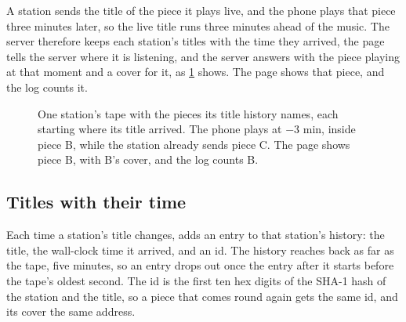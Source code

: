 \documentclass[11pt,a4paper]{article}
\begin{document}
A station sends the title of the piece it plays live, and the phone plays that piece three minutes later, so the live title runs three minutes ahead of the music. The server therefore keeps each station's titles with the time they arrived, the page tells the server where it is listening, and the server answers with the piece playing at that moment and a cover for it, as \cref{fig:heard} shows. The page shows that piece, and the log counts it.

\begin{figure}[ht]
\centering
{}
\caption{One station's tape with the pieces its title history names, each starting where its title arrived. The phone plays at $-3$ min, inside piece B, while the station already sends piece C. The page shows piece B, with B's cover, and the log counts B.}
\label{fig:heard}
\end{figure}

\subsection*{Titles with their time}

Each time a station's title changes,  adds an entry to that station's history: the title, the wall-clock time it arrived, and an id. The history reaches back as far as the tape, five minutes, so an entry drops out once the entry after it starts before the tape's oldest second. The id is the first ten hex digits of the SHA-1 hash of the station and the title, so a piece that comes round again gets the same id, and its cover the same address.
\end{document}
